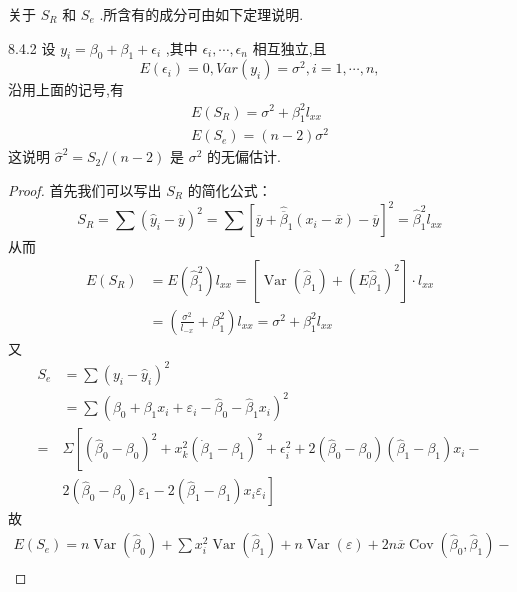 关于 $ S_R $ 和 $ S_e $ .所含有的成分可由如下定理说明.
\begin{theorem}{}{8.4.2}
	设  $ y_i=\beta_0+\beta_1+\epsilon_i $ ,其中  $ \epsilon_i,\cdots,\epsilon_n $ 相互独立,且
	\[
	E\left( \epsilon _i \right) =0,Var\left( y_i \right) =\sigma ^2,i=1,\cdots ,n,
	\]
	沿用上面的记号,有
	\begin{align}
	E\left( S_R \right) =\sigma ^2+\beta _{1}^{2}l_{xx}\\
	E\left( S_e \right) =\left( n-2 \right) \sigma ^2
	\end{align}
	这说明 $ \widehat{\sigma }^2=S_2/\left( n-2 \right)  $ 是 $ \sigma^2 $ 的无偏估计.
\end{theorem}
\begin{proof}{}{}
	首先我们可以写出 $ S_R $ 的简化公式：
	\begin{equation}
	S_{R}=\sum\left(\hat{y}_{i}-\overline{y}\right)^{2}=\sum\left[\overline{y}+\hat{\overline{\beta}}_{1}\left(x_{i}-\overline{x}\right)-\overline{y}\right]^{2}=\hat{\beta}_{1}^{2} l_{x x}
	\end{equation}\label{eq:8.4.16}
	从而
	\[
	\begin{aligned} 
	E\left(S_{R}\right) &=E\left(\hat{\beta}_{1}^{2}\right) l_{x x}=\left[\operatorname{Var}\left(\hat{\beta}_{1}\right)+\left(E \hat{\beta}_{1}\right)^{2}\right] \cdot l_{x x} \\ 
	&=\left(\frac{\sigma^{2}}{l_{-x}}+\beta_{1}^{2}\right) l_{x x}=\sigma^{2}+\beta_{1}^{2} l_{x x} 
	\end{aligned}
	\]
	又
	\[
	\begin{aligned} 
	S_{e} &=\sum\left(y_{i}-\hat{y}_{i}\right)^{2} \\ 
	&=\sum\left(\beta_{0}+\beta_{1} x_{i}+\varepsilon_{i}-\hat{\beta}_{0}-\hat{\beta}_{1} x_{i}\right)^{2}\\ 
	=& \Sigma\left[\left(\hat{\beta}_{0}-\beta_{0}\right)^{2}+x_{k}^{2}\left(\dot{\beta}_{1}-\beta_{1}\right)^{2}+\epsilon_{i}^{2}+2\left(\hat{\beta}_{0}-\beta_{0}\right)\left(\hat{\beta}_{1}-\beta_{1}\right) x_{i}-\right.\\ 
	&\left.2\left(\hat{\beta}_{0}-\beta_{0}\right) \varepsilon_{1}-2\left(\hat{\beta}_{1}-\beta_{1}\right) x_{i} \varepsilon_{i}\right] 
	\end{aligned}
	\]
	故
	\[
	\begin{array}{c}
	{E\left(S_{e}\right)=n \operatorname{Var}\left(\hat{\beta}_{0}\right)+\sum x_{i}^{2} \operatorname{Var}\left(\hat{\beta}_{1}\right)+n \operatorname{Var}(\varepsilon)+2 n \overline{x} \operatorname{Cov}\left(\hat{\beta}_{0}, \hat{\beta}_{1}\right)-} \\ 

\end{array}\]
\end{proof}
